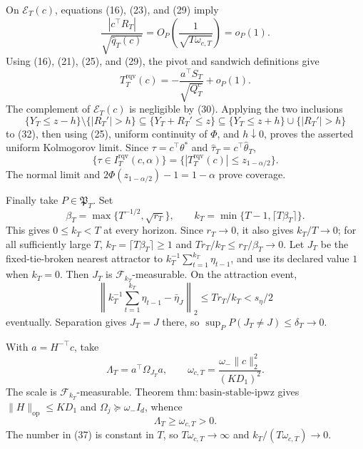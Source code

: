 On \(\mathcal E_T(c)\), equations (16), (23), and (29) imply
\[
 \frac{|c^\top R_T|}{\sqrt{\widehat q_T(c)}}
 =O_P\!\left(\frac1{\sqrt{T\omega_{c,T}}}\right)=o_P(1).
\tag{31}
\]
Using (16), (21), (25), and (29), the pivot and sandwich definitions give
\[
 T_T^{\mathrm{rqv}}(c)
 =-\frac{a^\top S_T}{\sqrt{Q_T^c}}+o_P(1).
\tag{32}
\]
The complement of \(\mathcal E_T(c)\) is negligible by (30).  Applying the
two inclusions
\[
 \{Y_T\le z-h\}\setminus\{|R_T'|>h\}
 \subseteq\{Y_T+R_T'\le z\}
 \subseteq\{Y_T\le z+h\}\cup\{|R_T'|>h\}
\tag{33}
\]
to (32), then using (25), uniform continuity of \(\Phi\), and
\(h\downarrow0\), proves the asserted uniform Kolmogorov limit.  Since
\(\tau=c^\top\theta^*\) and \(\widehat\tau_T=c^\top\widehat\theta_T\),
\[
 \{\tau\in I_T^{\mathrm{rqv}}(c,\alpha)\}
 =\{|T_T^{\mathrm{rqv}}(c)|\le z_{1-\alpha/2}\}.
\tag{34}
\]
The normal limit and
\(2\Phi(z_{1-\alpha/2})-1=1-\alpha\) prove coverage.

Finally take \(P\in\mathfrak P_T\).  Set
\[
 \beta_T=\max\{T^{-1/2},\sqrt{r_T}\},\qquad
 k_T=\min\{T-1,\lceil T\beta_T\rceil\}.
\tag{35}
\]
This gives \(0\le k_T<T\) at every horizon.  Since \(r_T\to0\), it also
gives \(k_T/T\to0\); for all sufficiently large \(T\),
\(k_T=\lceil T\beta_T\rceil\ge1\) and
\(Tr_T/k_T\le r_T/\beta_T\to0\).  Let \(J_T\) be the fixed-tie-broken
nearest attractor to \(k_T^{-1}\sum_{t=1}^{k_T}\eta_{t-1}\), and use its
declared value \(1\) when \(k_T=0\).  Then \(J_T\) is
\(\mathcal F_{k_T}\)-measurable.  On the attraction event,
\[
 \left\|k_T^{-1}\sum_{t=1}^{k_T}\eta_{t-1}-\bar\eta_J\right\|_2
 \le Tr_T/k_T<s_\eta/2
\tag{36}
\]
eventually.  Separation gives \(J_T=J\) there, so
\(\sup_PP(J_T\ne J)\le\delta_T\to0\).

With \(a=H^{-\top}c\), take
\[
 \Lambda_T=a^\top\Omega_{J_T}a,
 \qquad \omega_{c,T}=\frac{\omega_-\|c\|_2^2}{(KD_1)^2}.
\tag{37}
\]
The scale is \(\mathcal F_{k_T}\)-measurable.  Theorem
\(\mathrm{thm:basin\text{-}stable\text{-}ipwz}\) gives
\(\|H\|_{\mathrm{op}}\le KD_1\) and
\(\Omega_j\succeq\omega_-I_d\), whence
\[
 \Lambda_T\ge\omega_{c,T}>0.
\tag{38}
\]
The number in (37) is constant in \(T\), so
\(T\omega_{c,T}\to\infty\) and
\(k_T/(T\omega_{c,T})\to0\).

